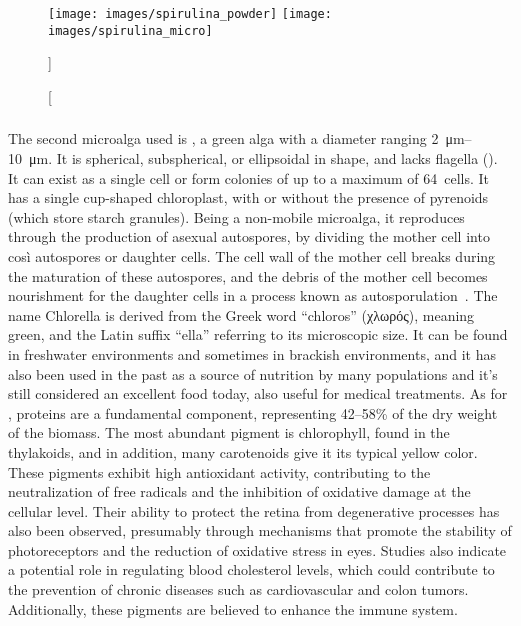 \begin{figure}[H]
\centering
		{\texttt{[image: images/spirulina\_powder]}}%
\hfill
		{\texttt{[image: images/spirulina\_micro]}}%
\caption%
[]%
{}
\label{fig:}
\end{figure}

\subsubsection{}
The second microalga used is , a green alga with a diameter ranging \qtyrange{2}{10}{\micro\metre}. It is spherical, subspherical, or ellipsoidal in shape, and lacks flagella (). It can exist as a single cell or form colonies of up to a maximum of \qty{64}{cells}. It has a single cup-shaped chloroplast, with or without the presence of pyrenoids (which store starch granules). Being a non-mobile microalga, it reproduces through the production of asexual autospores, by dividing the mother cell into  così autospores or daughter cells. The cell wall of the mother cell breaks during the maturation of these autospores, and the debris of the mother cell becomes nourishment for the daughter cells in a process known as autosporulation~\parencite{ru_Chlorella_2020}. The name Chlorella is derived from the Greek word “chloros” (χλωρός), meaning green, and the Latin suffix “ella” referring to its microscopic size. It can be found in freshwater environments and sometimes in brackish environments, and it has also been used in the past as a source of nutrition by many populations and it’s still considered an excellent food today, also useful for medical treatments. As for , proteins are a fundamental component, representing \numrange{42}{58}\%\zariv{} of the dry weight of the biomass. The most abundant pigment is chlorophyll, found in the thylakoids, and in addition, many carotenoids give it its typical yellow color. These pigments exhibit high antioxidant activity, contributing to the neutralization of free radicals and the inhibition of oxidative damage at the cellular level. Their ability to protect the retina from degenerative processes has also been observed, presumably through mechanisms that promote the stability of photoreceptors and the reduction of oxidative stress in eyes. Studies also indicate a potential role in regulating blood cholesterol levels, which could contribute to the prevention of chronic diseases such as cardiovascular and colon tumors. Additionally, these pigments are believed to enhance the immune system.

